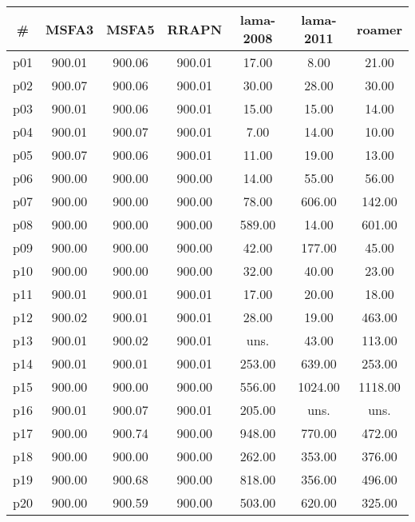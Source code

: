 \begin{tabular}{c||c|c|c|c|c|c}
\textbf{\#} & \textbf{MSFA3} & \textbf{MSFA5} & \textbf{RRAPN} & \textbf{lama-2008} & \textbf{lama-2011} & \textbf{roamer}\\
\hline
\hline
p01 & 900.01 & 900.06 & 900.01 & 17.00 & 8.00 & 21.00\\
p02 & 900.07 & 900.06 & 900.01 & 30.00 & 28.00 & 30.00\\
p03 & 900.01 & 900.06 & 900.01 & 15.00 & 15.00 & 14.00\\
p04 & 900.01 & 900.07 & 900.01 & 7.00 & 14.00 & 10.00\\
p05 & 900.07 & 900.06 & 900.01 & 11.00 & 19.00 & 13.00\\
p06 & 900.00 & 900.00 & 900.00 & 14.00 & 55.00 & 56.00\\
p07 & 900.00 & 900.00 & 900.00 & 78.00 & 606.00 & 142.00\\
p08 & 900.00 & 900.00 & 900.00 & 589.00 & 14.00 & 601.00\\
p09 & 900.00 & 900.00 & 900.00 & 42.00 & 177.00 & 45.00\\
p10 & 900.00 & 900.00 & 900.00 & 32.00 & 40.00 & 23.00\\
p11 & 900.01 & 900.01 & 900.01 & 17.00 & 20.00 & 18.00\\
p12 & 900.02 & 900.01 & 900.01 & 28.00 & 19.00 & 463.00\\
p13 & 900.01 & 900.02 & 900.01 & uns. & 43.00 & 113.00\\
p14 & 900.01 & 900.01 & 900.01 & 253.00 & 639.00 & 253.00\\
p15 & 900.00 & 900.00 & 900.00 & 556.00 & 1024.00 & 1118.00\\
p16 & 900.01 & 900.07 & 900.01 & 205.00 & uns. & uns.\\
p17 & 900.00 & 900.74 & 900.00 & 948.00 & 770.00 & 472.00\\
p18 & 900.00 & 900.00 & 900.00 & 262.00 & 353.00 & 376.00\\
p19 & 900.00 & 900.68 & 900.00 & 818.00 & 356.00 & 496.00\\
p20 & 900.00 & 900.59 & 900.00 & 503.00 & 620.00 & 325.00\\
\end{tabular}

